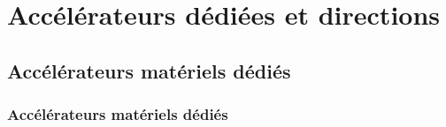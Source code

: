 
\section[\'Etat-de-l'art]{Accélérateurs dédiées et directions}

\subsection{Accélérateurs matériels dédiés}


\begin{frame}
    \frametitle{Accélérateurs matériels dédiés}


\end{frame}
